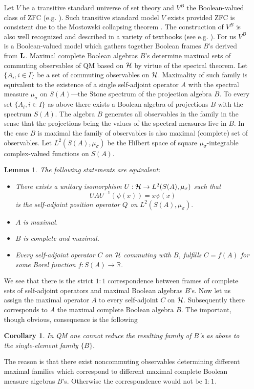 \documentclass[12pt]{article}
\newtheorem{Lemma}{Lemma}
\newtheorem{Corollary}{Corollary}
\begin{document}
Let $V$ be a transitive standard universe of set theory and $V^B$ the Boolean-valued class of ZFC (e.g. \cite{Jech2003}). Such transitive standard model $V$ exists provided ZFC is consistent due to the Mostowski collapsing theorem \cite{Jech2003}. The construction of $V^B$ is also well recognized and described in a variety of textbooks (see e.g. \cite{Jech2003,Bell2005}). For us $V^B$ is a Boolean-valued model which gathers together Boolean frames $B$'s derived from ${\bf L}$. Maximal complete Boolean algebras $B$'s determine maximal sets of commuting observables of QM based on ${\cal H}$ by virtue of the spectral theorem. Let $\{A_i,i\in I\}$ be a set of commuting observables on ${\cal H}$. Maximality of such family is equivalent to the existence of a single self-adjoint operator $A$ with the spectral measure $\mu_{\sigma}$ on $S(A)$---the Stone spectrum of the projection algebra $B$. To every set $\{A_i,i\in I\}$ as above there exists a Boolean algebra of projections $B$ with the spectrum $S(A)$. The algebra $B$ generates all observables in the family in the sense that the projections being the values of the spectral measures live in $B$. In the case $B$ is maximal the family of observables is also maximal (complete) set of observables. Let $L^2(S(A),\mu_{\sigma})$ be the Hilbert space of square $\mu_{\sigma}$-integrable complex-valued functions on $S(A)$. 
\begin{Lemma}\cite{Boos1996}
The following statements are equivalent:
\begin{itemize}
    \item[i.] There exists a unitary isomorphism $U:{\cal H}\to L^2(S(A),\mu_{\sigma})$ such that 
    \[UAU^{-1}(\psi(x))=x\psi(x)
    \] is the self-adjoint position operator $Q$ on $L^2(S(A),\mu_{\sigma})$.
\item[ii.]  $A$ is maximal.
\item[iii.] $B$ is complete and maximal.
\item[iv.] Every self-adjoint operator $C$ on ${\cal H}$ commuting with $B$, fulfills $C=f(A)$ for some Borel function $f:S(A)\to \mathbb{R}$.
\end{itemize}
\end{Lemma}
We see that there is the strict $1:1$ correspondence between frames of complete sets of self-adjoint operators and maximal Boolean algebras $B$'s. Now let us assign the maximal operator $A$ to every self-adjoint $C$ on ${\cal H}$. Subsequently there corresponds to $A$ the maximal complete Boolean algebra $B$. The important, though obvious, consequence is the following
\begin{Corollary}\label{corr1}
In QM one cannot reduce the resulting family of $B$'s as above to the single-element family $\{B\}$.
\end{Corollary}
The reason is that there exist noncommuting observables determining different maximal families which correspond to different maximal complete Boolean measure algebras $B$'s. Otherwise the correspondence would not be $1:1$.
\end{document}
